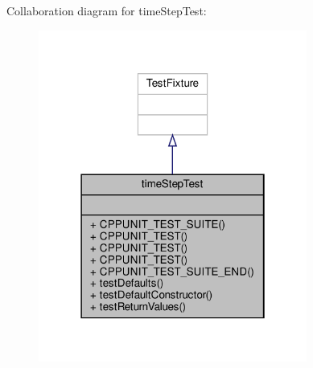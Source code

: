 Collaboration diagram for time\+Step\+Test\+:\nopagebreak
\begin{figure}[H]
\begin{center}
\leavevmode
\includegraphics[width=250pt]{classtimeStepTest__coll__graph}
\end{center}
\end{figure}
